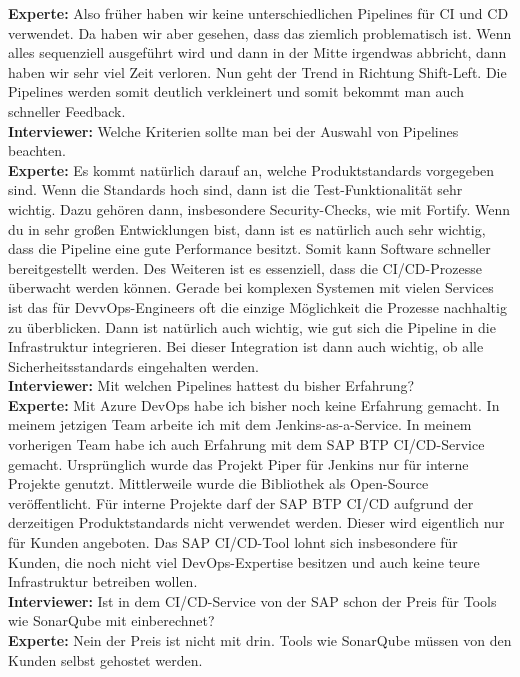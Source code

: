 \begin{linenumbers}
    \textbf{Experte:} Also früher haben wir keine unterschiedlichen Pipelines für CI und CD verwendet. Da haben wir aber gesehen, dass das ziemlich problematisch ist. Wenn alles sequenziell ausgeführt wird und dann in der Mitte irgendwas abbricht, dann haben wir sehr viel Zeit verloren. Nun geht der Trend in Richtung Shift-Left. Die Pipelines werden somit deutlich verkleinert und somit bekommt man auch schneller Feedback.\\
    \textbf{Interviewer:} Welche Kriterien sollte man bei der Auswahl von Pipelines beachten.\\
    \textbf{Experte:} Es kommt natürlich darauf an, welche Produktstandards vorgegeben sind. Wenn die Standards hoch sind, dann ist die Test-Funktionalität sehr wichtig. Dazu gehören dann, insbesondere Security-Checks, wie mit Fortify. Wenn du in sehr großen Entwicklungen bist, dann ist es natürlich auch sehr wichtig, dass die Pipeline eine gute Performance besitzt. Somit kann Software schneller bereitgestellt werden. Des Weiteren ist es essenziell, dass die CI/CD-Prozesse überwacht werden können. Gerade bei komplexen Systemen mit vielen Services ist das für DevvOps-Engineers oft die einzige Möglichkeit die Prozesse nachhaltig zu überblicken. Dann ist natürlich auch wichtig, wie gut sich die Pipeline in die Infrastruktur integrieren. Bei dieser Integration ist dann auch wichtig, ob alle Sicherheitsstandards eingehalten werden.\\
    \textbf{Interviewer:} Mit welchen Pipelines hattest du bisher Erfahrung?\\
    \textbf{Experte:} Mit Azure DevOps habe ich bisher noch keine Erfahrung gemacht. In meinem jetzigen Team arbeite ich mit dem Jenkins-as-a-Service. In meinem vorherigen Team habe ich auch Erfahrung mit dem SAP BTP CI/CD-Service gemacht. Ursprünglich wurde das Projekt Piper für Jenkins nur für interne Projekte genutzt. Mittlerweile wurde die Bibliothek als Open-Source veröffentlicht. Für interne Projekte darf der SAP BTP CI/CD aufgrund der derzeitigen Produktstandards nicht verwendet werden. Dieser wird eigentlich nur für Kunden angeboten. Das SAP CI/CD-Tool lohnt sich insbesondere für Kunden, die noch nicht viel DevOps-Expertise besitzen und auch keine teure Infrastruktur betreiben wollen.\\
    \textbf{Interviewer:} Ist in dem CI/CD-Service von der SAP schon der Preis für Tools wie SonarQube mit einberechnet?\\
    \textbf{Experte:} Nein der Preis ist nicht mit drin. Tools wie SonarQube müssen von den Kunden selbst gehostet werden.\\

\end{linenumbers}
